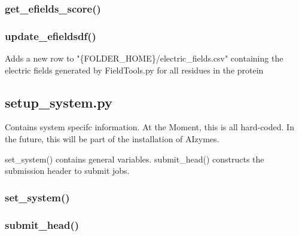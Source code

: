 \documentclass[10pt]{extarticle}
\begin{document}
\subsubsection{get\_efields\_score()}
\subsubsection{update\_efieldsdf()}
Adds a new row to "\{FOLDER\_HOME\}/electric\_fields.csv" containing the electric fields
generated by FieldTools.py for all residues in the protein
\subsection{setup\_system.py}
Contains system specifc information. At the Moment, this is all hard-coded.
In the future, this will be part of the installation of AIzymes.

set\_system() contains general variables.
submit\_head() constructs the submission header to submit jobs.
\subsubsection{set\_system()}
\subsubsection{submit\_head()}
\end{document}
